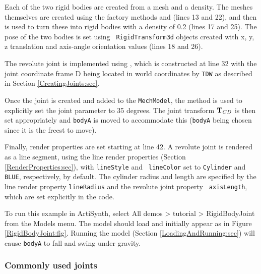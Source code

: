Each of the two rigid bodies are created from a mesh and a density.
The meshes themselves are created using the factory methods
 and
(lines 13 and 22), and then
 is
used to turn these into rigid bodies with a density of 0.2 (lines 17
and 25). The pose of the two bodies is set using {\tt
RigidTransform3d} objects created with x, y, z translation and
axis-angle orientation values (lines 18 and 26).

The revolute joint is implemented using
, which is
constructed at line 32 with the joint coordinate frame D being located
in world coordinates by {\tt TDW} 
as described in Section \ref{CreatingJoints:sec}.

Once the joint is created and added to the {\tt MechModel}, the method
 is
used to explicitly set the joint parameter to 35 degrees. The joint
transform ${\bf T}_{CD}$ is then set appropriately and {\tt bodyA} is moved
to accommodate this ({\tt bodyA} being chosen since it is the freest
to move).

Finally, render properties are set starting at line 42. A revolute
joint is rendered as a line segment, using the line render properties
(Section \ref{RenderProperties:sec}), with {\tt lineStyle} and {\tt
lineColor} set to {\tt Cylinder} and {\tt BLUE}, respectively, by
default. The cylinder radius and length are specified by the line
render property {\tt lineRadius} and the revolute joint property {\tt
axisLength}, which are set explicitly in the code.

To run this example in ArtiSynth, select {\sf All demos > tutorial >
RigidBodyJoint} from the {\sf Models} menu. The model should load and
initially appear as in Figure \ref{RigidBodyJoint:fig}.  Running the
model (Section \ref{LoadingAndRunning:sec}) will cause {\tt bodyA} to
fall and swing under gravity.

\subsubsection{Commonly used joints}
\label{CommonJoints:sec}

